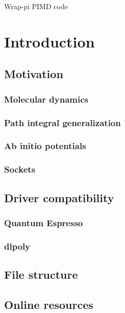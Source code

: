 \documentclass[12pt,fleqn]{report}
\begin{document}
\begin{titlepage}
\begin{center}

\vspace*{+5.5cm}

{\LARGE Wrap-pi PIMD code}
\end{center}
\end{titlepage}


\tableofcontents
\listoffigures

\newpage
{}

\chapter{Introduction}
\section{Motivation}
\subsection{Molecular dynamics}
\subsection{Path integral generalization}
\subsection{Ab initio potentials}
\subsection{Sockets}
\section{Driver compatibility}
\subsection{Quantum Espresso}
\subsection{dlpoly}
\section{File structure}
\section{Online resources}
\end{document}
